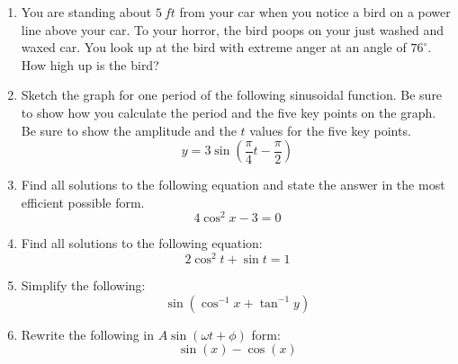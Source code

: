 \documentclass[letterpaper,12pt,fleqn]{article}
\newcommand{\w}{\omega}
\newcommand{\p}{\phi}
\begin{document}
\begin{enumerate}
  \vspace{4in}

\item You are standing about $\SI{5}{ft}$ from your car when you notice a bird
  on a power line above your car. To your horror, the bird poops on your just
  washed and waxed car. You look up at the bird with extreme anger at an angle
  of $76^{\circ}$. How high up is the bird?

  \newpage

\item Sketch the graph for one period of the following sinusoidal function. Be
  sure to show how you calculate the period and the five key points on the
  graph. Be sure to show the amplitude and the $t$ values for the five key
  points.
  \[y=3\sin\left(\frac{\pi}{4}t-\frac{\pi}{2}\right)\]
  
  
  \newpage

\item Find all solutions to the following equation and state the answer in the
  most efficient possible form.
  \[4\cos^2x-3=0\]

  \vspace{3in}

\item Find all solutions to the following equation:
  \[2\cos^2t+\sin t=1\]

  \newpage
  
\item Simplify the following:
  \[\sin(\cos^{-1}x+\tan^{-1}y)\]

  \vspace{3.5in}

\item Rewrite the following in $A\sin(\w t+\p)$ form:
  \[\sin(x)-\cos(x)\]
\end{enumerate}
  
\end{document}
